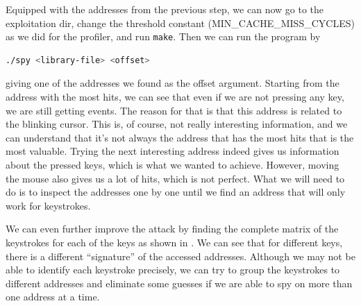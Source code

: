 Equipped with the addresses from the previous step, we can now go to the
exploitation dir, change the threshold constant (MIN\_CACHE\_MISS\_CYCLES) as we
did for the profiler, and run \texttt{make}. Then we can run the program by 
\begin{lstlisting}[language=bash]
./spy <library-file> <offset>
\end{lstlisting}
giving one of the addresses we found as the offset argument. Starting from the
address with the most hits, we can see that even if we are not pressing any key,
we are still getting events. The reason for that is that this address is related
to the blinking cursor. This is, of course, not really interesting information,
and we can understand that it's not always the address that has the most hits
that is the most valuable. Trying the next interesting address indeed gives us
information about the pressed keys, which is what we wanted to achieve. However,
moving the mouse also gives us a lot of hits, which is not perfect. What we will
need to do is to inspect the addresses one by one until we find an address that
will only work for keystrokes.

We can even further improve the attack by finding the complete matrix of the
keystrokes for each of the keys as shown in . We
can see that for different keys, there is a different “signature” of the
accessed addresses. Although we may not be able to identify each keystroke
precisely, we can try to group the keystrokes to different addresses and
eliminate some guesses if we are able to spy on more than one address at a time.

